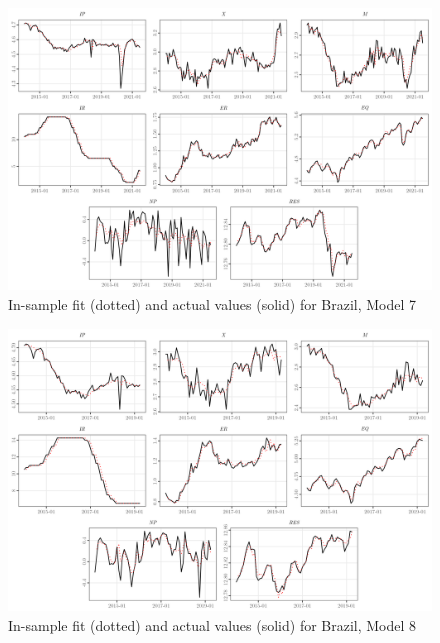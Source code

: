 \documentclass[a4paper, twoside]{templates/ociamthesis}
\begin{document}
\begin{figure}[!ht]

{\centering \includegraphics[width=0.99\columnwidth]{figure/g.model7t.BR} 

}

\caption{In-sample fit (dotted) and actual values (solid) for Brazil, Model 7}\label{fig:Figure5FITBR7}
\end{figure}

\begin{figure}[!ht]

{\centering \includegraphics[width=0.99\columnwidth]{figure/g.model8t.BR} 

}

\caption{In-sample fit (dotted) and actual values (solid) for Brazil, Model 8}\label{fig:Figure5FITBR8}
\end{figure}

\clearpage
\end{document}
